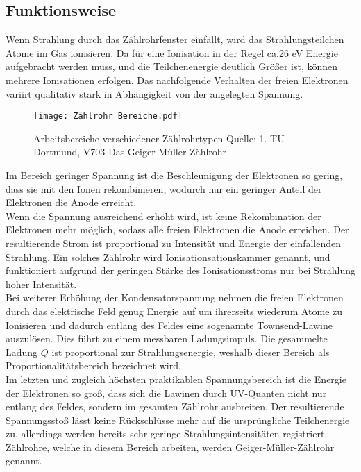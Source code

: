 \subsection{Funktionsweise}
Wenn Strahlung durch das Zählrohrfenster einfällt, wird das Strahlungsteilchen Atome im Gas ionisieren. Da für eine Ionisation in der Regel ca.26 eV Energie aufgebracht werden muss, und die Teilchenenergie deutlich Größer ist, können mehrere Ionisationen erfolgen. Das nachfolgende Verhalten der freien Elektronen variirt qualitativ stark in Abhängigkeit von der angelegten Spannung. \\
\begin{figure}[h]
  \centering
  \texttt{[image: Zählrohr Bereiche.pdf]}
  \caption{Arbeitsbereiche verschiedener Zählrohrtypen Quelle: 1. TU-Dortmund, V703 Das Geiger-Müller-Zählrohr} %
  \label{fig:vanadium}
\end{figure}
Im Bereich geringer Spannung ist die Beschleunigung der Elektronen so gering, dass sie mit den Ionen rekombinieren, wodurch nur ein geringer Anteil der Elektronen die Anode erreicht.\\ Wenn die Spannung ausreichend erhöht wird, ist keine Rekombination der Elektronen mehr möglich, sodass alle freien Elektronen die Anode erreichen. Der resultierende Strom ist proportional zu Intensität und Energie der einfallenden Strahlung. Ein solches Zählrohr wird Ionisationsationskammer genannt, und funktioniert aufgrund der geringen Stärke des Ionisationsstroms nur bei Strahlung hoher Intensität. \\
Bei weiterer Erhöhung der Kondensatorspannung nehmen die freien Elektronen durch das elektrische Feld genug Energie auf um ihrerseits wiederum Atome zu Ionisieren und dadurch entlang des Feldes eine sogenannte Townsend-Lawine auszulösen. Dies führt zu einem messbaren Ladungsimpuls. Die gesammelte Ladung $Q$ ist proportional zur Strahlungsenergie, weshalb dieser Bereich als Proportionalitätsbereich bezeichnet wird. \\ Im letzten und zugleich höchsten praktikablen Spannungsbereich ist die Energie der Elektronen so groß, dass sich die Lawinen durch UV-Quanten nicht nur entlang des Feldes, sondern im gesamten Zählrohr ausbreiten. Der resultierende Spannungsstoß lässt keine Rückschlüsse mehr auf die ursprüngliche Teilchenergie zu, allerdings werden bereits sehr geringe Strahlungsintensitäten registriert. Zählrohre, welche in diesem Bereich arbeiten, werden Geiger-Müller-Zählrohr genannt.
